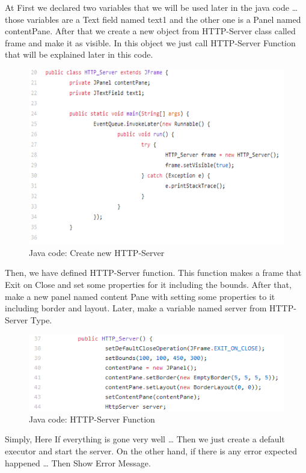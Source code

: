 At First we declared two variables that we will be used later in the java code … those variables are a Text field named text1 and the other one is a Panel named contentPane.  After that we create a new object from HTTP-Server class called frame and make it as visible. In this object we just call HTTP-Server Function that will be explained later in this code.

\begin{figure}[h]
    \centering
    \includegraphics[width=.9\textwidth]{figures/43.png}
    \caption{Java code: Create new HTTP-Server}
    \label{fig:my_label}
\end{figure}

\newpage
Then, we have defined HTTP-Server function. This function makes a frame that Exit on Close and set some properties for it including the bounds. After that, make a new panel named content Pane with setting some properties to it including border and layout. Later, make a variable named server from HTTP-Server Type.

\begin{figure}[h]
    \centering
    \includegraphics{figures/44.png}
    \caption{Java code: HTTP-Server Function}
    \label{fig:my_label}
\end{figure}

Simply, Here If everything is gone very well … Then we just create a default executor and start the server. On the other hand, if there is any error expected happened … Then Show Error Message.

